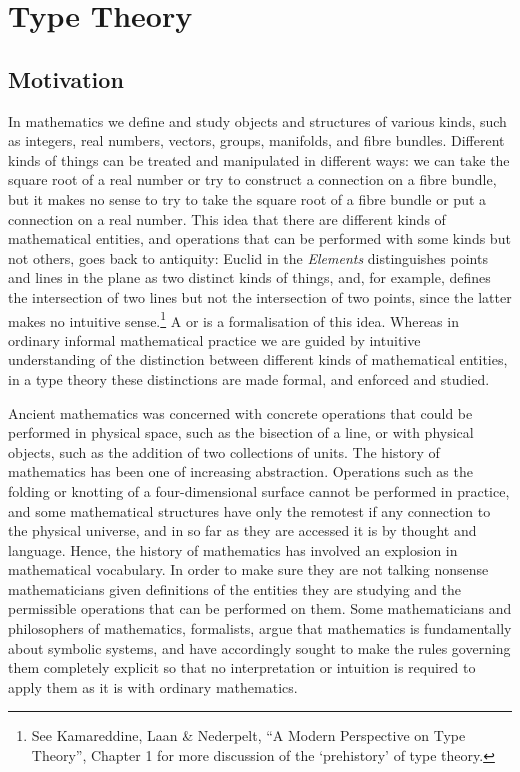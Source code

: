 \section{Type Theory}
\label{sec:TypeTheory}
\subsection{Motivation}
\label{sec:TypeTheory-Motivation}
In mathematics we define and study objects and structures of various kinds, such as integers, real numbers, vectors, groups, manifolds, and fibre bundles. Different kinds of things can be treated and manipulated in different ways: we can take the square root of a real number or try to construct a connection on a fibre bundle, but it makes no sense to try to take the square root of a fibre bundle or put a connection on a real number. This idea that there are different kinds of mathematical entities, and operations that can be performed with some kinds but not others, goes back to antiquity: Euclid in the \emph{Elements} distinguishes points and lines in the plane as two distinct kinds of things, and, for example, defines the intersection of two lines but not the intersection of two points, since the latter makes no intuitive sense.\footnote{
See Kamareddine, Laan \& Nederpelt, ``A Modern Perspective on Type Theory'', Chapter 1 for more discussion of the `prehistory' of type theory.
}
A  or  is a formalisation of this idea.  Whereas in ordinary informal mathematical practice we are guided by intuitive understanding of the distinction between different kinds of mathematical entities, in a type theory these distinctions are made formal, and enforced and studied.

Ancient mathematics was concerned with concrete operations that could be performed in physical space, such as the bisection of a line, or with physical objects, such as the addition of two collections of units. The history of mathematics has been one of increasing abstraction. Operations such as the folding or knotting of a four-dimensional surface cannot be performed in practice, and some mathematical structures have only the remotest if any connection to the physical universe, and in so far as they are accessed it is by thought and language. Hence, the history of mathematics has involved an explosion in mathematical vocabulary. In order to make sure they are not talking nonsense mathematicians given definitions of the entities they are studying and the permissible operations that can be performed on them. Some mathematicians and philosophers of mathematics, formalists, argue that mathematics is fundamentally about symbolic systems, and have accordingly sought to make the rules governing them completely explicit so that no interpretation or intuition is required to apply them as it is with ordinary mathematics.

